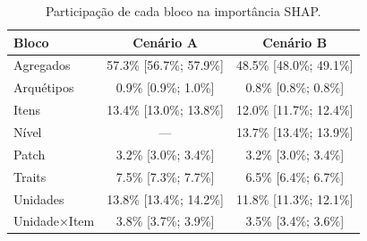 \begin{table}[htbp]
\caption{Participação de cada bloco na importância SHAP.}
\label{tab:blocos}
\centering
\small
\begin{tabular}{lcc}
\toprule
Bloco & Cenário A & Cenário B \\
\midrule
Agregados & 57.3\% [56.7\%; 57.9\%] & 48.5\% [48.0\%; 49.1\%] \\
Arquétipos & 0.9\% [0.9\%; 1.0\%] & 0.8\% [0.8\%; 0.8\%] \\
Itens & 13.4\% [13.0\%; 13.8\%] & 12.0\% [11.7\%; 12.4\%] \\
Nível & — & 13.7\% [13.4\%; 13.9\%] \\
Patch & 3.2\% [3.0\%; 3.4\%] & 3.2\% [3.0\%; 3.4\%] \\
Traits & 7.5\% [7.3\%; 7.7\%] & 6.5\% [6.4\%; 6.7\%] \\
Unidades & 13.8\% [13.4\%; 14.2\%] & 11.8\% [11.3\%; 12.1\%] \\
Unidade×Item & 3.8\% [3.7\%; 3.9\%] & 3.5\% [3.4\%; 3.6\%] \\
\bottomrule
\end{tabular}
\end{table}
